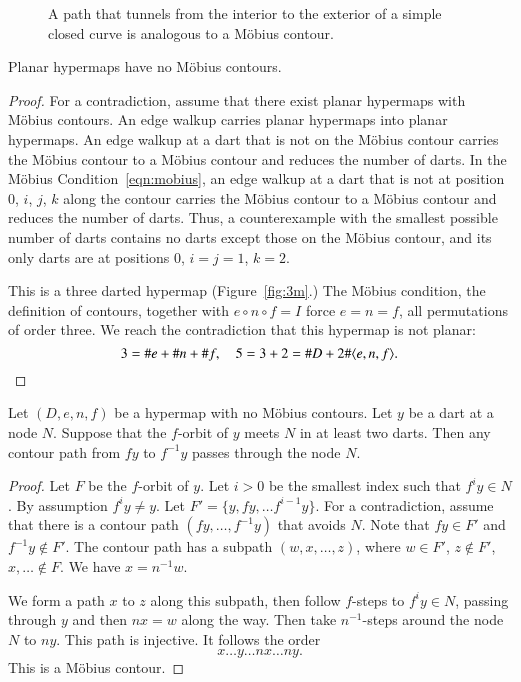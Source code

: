 \begin{figure}[htb]
  \centering
  \caption{A path that tunnels from the interior to the exterior
   of a simple closed curve
   is analogous to a M\"obius contour.}
  \label{fig:violate-jct}
\end{figure}






\begin{lemma}\label{lemma:no-mobius}  
Planar hypermaps have no M\"obius contours.
\end{lemma}

\begin{proof} For a contradiction, assume that there exist planar
hypermaps with M\"obius contours.  An edge walkup carries
planar hypermaps into planar hypermaps. An edge walkup
at a dart that is not on the M\"obius contour carries the
M\"obius contour to a M\"obius contour 
and reduces the number of darts.  
In the M\"obius Condition~\ref{eqn:mobius},
an edge walkup at a dart that is not at position $0$, $i$, $j$, $k$
along the contour carries the M\"obius contour to a M\"obius contour
and reduces the number of darts. Thus, a counterexample with
the smallest possible number of darts contains no
darts except those on the M\"obius contour, and its only darts
are at positions $0$, $i=j=1$, $k=2$.

This is a three darted hypermap (Figure~\ref{fig:3m}.)  
The M\"obius condition, the
definition of contours, together with $e\circ n\circ f=I$ force
$e=n=f$, all permutations of order three. We reach the contradiction
that this hypermap is not planar:
    $$3 = \# e + \# n + \# f,\quad 5 = 3+2 = \# D + 2 \#\langle e,n,f\rangle.$$
\end{proof}


\begin{lemma}\label{lemma:node-nonsimple}  
Let $(D,e,n,f)$ be a hypermap with no M\"obius contours.
Let $y$ be a dart at a node $N$.
Suppose that the $f$-orbit of $y$ meets $N$ in
at least two darts.  Then any contour path from $f y$
to $f^{-1} y$ passes through the node $N$. 
\end{lemma}

\begin{proof} Let $F$ be the $f$-orbit of $y$.
Let $i>0$ be the smallest index such that $f^i y\in N$.
By assumption $f^i y \ne y$.
Let $F' = \{y,f y,\ldots f^{i-1} y\}$.
For a contradiction, assume that there is
a contour path  $(f y,\ldots,f^{-1} y)$ that avoids $N$.
Note that $f y\in F'$ and $f^{-1} y\not\in F'$.
%
The contour path has a subpath $(w,x,\ldots,z)$, where
$w\in F'$, $z\not\in F'$,  $x,\ldots\not\in F$.  
We have $x=n^{-1}w$.

We form a path $x$ to $z$ along this subpath, then
follow $f$-steps to $f^i y\in N$, passing through $y$ and
then $n x = w$ along the way.
Then take $n^{-1}$-steps around the node $N$ to $n y$.  This
path is injective.  It follows the order
   $$
   x\ldots y\ldots n x\ldots n y.
   $$
This is a M\"obius contour.
\end{proof}


